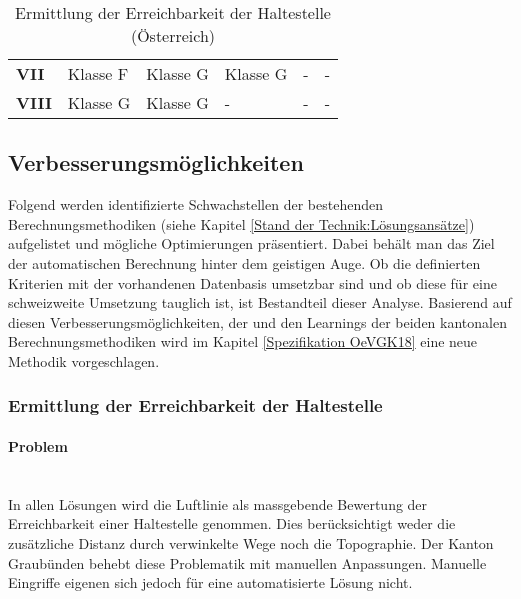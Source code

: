 \begin{table}[ht]
\begin{tabular}[c]{l p{2.0cm} p{2.0cm} p{2.0cm} p{2.0cm} p{2.0cm}}
        \cellcolor{red!25}\textbf{VII}
                                & \cellcolor{red!25}Klasse F
                                & \cellcolor{red!25}Klasse G
                                & \cellcolor{red!25}Klasse G
                                & -
                                & -\\
        \cellcolor{red!25}\textbf{VIII}
                                & \cellcolor{red!25}Klasse G
                                & \cellcolor{red!25}Klasse G
                                & -
                                & -
                                & -\\                          
        \bottomrule
    \end{tabular}
    \caption{Ermittlung der Erreichbarkeit der Haltestelle (Österreich)}
    \label{table:Ermittlung Erreichbarkeit der Haltestelle (Österreich)}
\end{table}

\subsection{Verbesserungsmöglichkeiten}
\label{Stand der Technik:Verbesserungsmöglichkeiten und Zusammenhang zu bestehenden Lösungen}

Folgend werden identifizierte Schwachstellen der bestehenden Berechnungsmethodiken (siehe Kapitel \ref{Stand der Technik:Lösungsansätze}) aufgelistet und mögliche Optimierungen präsentiert.
Dabei behält man das Ziel der automatischen Berechnung hinter dem geistigen Auge.
Ob die definierten Kriterien mit der vorhandenen Datenbasis umsetzbar sind und ob diese für eine schweizweite Umsetzung tauglich ist, ist Bestandteil dieser Analyse.
Basierend auf diesen Verbesserungsmöglichkeiten, der  und den Learnings der beiden kantonalen Berechnungsmethodiken wird im Kapitel \ref{Spezifikation OeVGK18} eine neue Methodik vorgeschlagen.

\subsubsection{Ermittlung der Erreichbarkeit der Haltestelle}
\label{Verbesserungsmöglichkeiten:Ermittlung der Erreichbarkeit der Haltestelle}

\paragraph{Problem}~\\
In allen Lösungen wird die Luftlinie als massgebende Bewertung der Erreichbarkeit einer Haltestelle genommen.
Dies berücksichtigt weder die zusätzliche Distanz durch verwinkelte Wege noch die Topographie.
Der Kanton Graubünden behebt diese Problematik mit manuellen Anpassungen.
Manuelle Eingriffe eigenen sich jedoch für eine automatisierte Lösung nicht.

